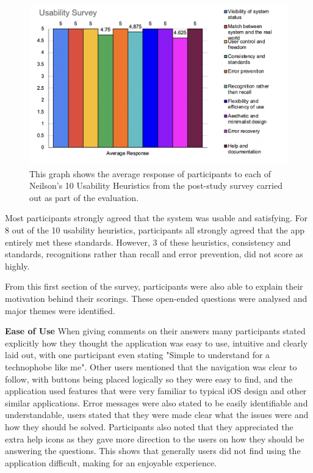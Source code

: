 \documentclass{l4proj}
\begin{document}
\begin{figure}
    \begin{centering}
    \includegraphics[scale=0.75]{images/UserStudyGraph.png}
    \caption{This graph shows the average response of participants to each of Neilson's 10 Usability Heuristics from the post-study survey carried out as part of the evaluation.}
    \label{fig: UserStudyGraph}
    \end{centering}
\end{figure}

\par 
Most participants strongly agreed that the system was usable and satisfying. For 8 out of the 10 usability
heuristics, participants all strongly agreed that the app entirely met these standards. 
However, 3 of these heuristics, consistency and standards, recognitions rather than recall and error prevention, did not score as highly.
\par 
From this first section of the survey, participants were also able to explain their motivation behind their scorings. 
These open-ended questions were analysed and major themes were identified.
\par 
\textbf{Ease of Use} When giving comments on their answers many participants stated explicitly how they thought the application was 
easy to use, intuitive and clearly laid out, with one participant even stating "Simple to understand for a technophobe like me". 
Other users mentioned that the navigation was clear to follow, with buttons being placed logically so they were easy to find,
and the application used features that were very familiar to typical iOS design and other similar applications. Error messages 
were also stated to be easily identifiable and understandable, users stated that they were 
made clear what the issues were and how they should be solved. Participants also noted that they appreciated the extra help icons 
as they gave more direction to the users on how they should be answering the questions.
This shows that generally users did not find using the application difficult, making for an enjoyable experience.
\par 
\end{document}
